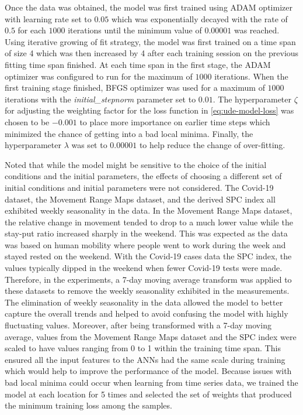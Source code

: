 Once the data was obtained, the model was first trained using ADAM optimizer with learning rate set to $0.05$ which was exponentially decayed with the rate of $0.5$ for each $1000$ iterations until the minimum value of $0.00001$ was reached.
Using iterative growing of fit strategy, the model was first trained on a time span of size 4 which was then increased by 4 after each training session on the previous fitting time span finished.
At each time span in the first stage, the ADAM optimizer was configured to run for the maximum of $1000$ iterations.
When the first training stage finished, BFGS optimizer was used for a maximum of $1000$ iterations with the \textit{initial\_stepnorm} parameter set to $0.01$.
The hyperparameter $\zeta$ for adjusting the weighting factor for the loss function in \autoref{eq:ude-model-loss} was chosen to be $-0.001$ to place more importance on earlier time steps which minimized the chance of getting into a bad local minima.
Finally, the hyperparameter $\lambda$ was set to $0.00001$ to help reduce the change of over-fitting.

Noted that while the model might be sensitive to the choice of the initial conditions and the initial parameters, the effects of choosing a different set of initial conditions and initial parameters were not considered.
The Covid-19 dataset, the Movement Range Maps dataset, and the derived \gls{SPC} index all exhibited weekly seasonality in the data.
In the Movement Range Maps dataset, the relative change in movement tended to drop to a much lower value while the stay-put ratio increased sharply in the weekend.
This was expected as the data was based on human mobility where people went to work during the week and stayed rested on the weekend.
With the Covid-19 cases data the \gls{SPC} index, the values typically dipped in the weekend when fewer Covid-19 tests were made.
Therefore, in the experiments, a 7-day moving average transform was applied to these datasets to remove the weekly seasonality exhibited in the measurements.
The elimination of weekly seasonality in the data allowed the model to better capture the overall trends and helped to avoid confusing the model with highly fluctuating values.
Moreover, after being transformed with a 7-day moving average, values from the Movement Range Maps dataset and the \gls{SPC} index were scaled to have values ranging from 0 to 1 within the training time span.
This ensured all the input features to the \glspl{ANN} had the same scale during training which would help to improve the performance of the model.
Because issues with bad local minima could occur when learning from time series data, we trained the model at each location for 5 times and selected the set of weights that produced the minimum training loss among the samples.
